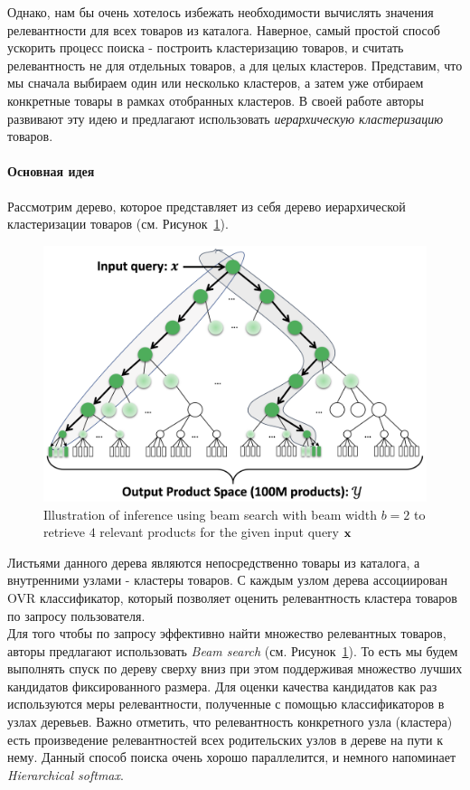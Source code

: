 Однако, нам бы очень хотелось избежать необходимости вычислять значения релевантности для всех товаров из каталога.
Наверное, самый простой способ ускорить процесс поиска - построить кластеризацию товаров, и считать релевантность не для отдельных товаров, а для целых кластеров.
Представим, что мы сначала выбираем один или несколько кластеров, а затем уже отбираем конкретные товары в рамках отобранных кластеров.
В своей работе авторы развивают эту идею и предлагают использовать \textit{иерархическую кластеризацию} товаров.

\paragraph{Основная идея} Рассмотрим дерево, которое представляет из себя дерево иерархической кластеризации товаров (см. Рисунок~\ref{fig:amazon_tree}).

\begin{figure}
    \includegraphics[width=1.0\linewidth]{images/amazon_tree.png}
    \caption{\footnotesize{Illustration of inference using beam search with beam width $b = 2$ to retrieve $4$ relevant products for the given input query ${\bf x}$}}
    \label{fig:amazon_tree}
\end{figure}

Листьями данного дерева являются непосредственно товары из каталога, а внутренними узлами - кластеры товаров.
С каждым узлом дерева ассоциирован OVR классификатор, который позволяет оценить релевантность кластера товаров по запросу пользователя. \\

Для того чтобы по запросу эффективно найти множество релевантных товаров, авторы предлагают использовать \textit{Beam search} (см. Рисунок~\ref{fig:amazon_tree}). 
То есть мы будем выполнять спуск по дереву сверху вниз при этом поддерживая множество лучших кандидатов фиксированного размера. 
Для оценки качества кандидатов как раз используются меры релевантности, полученные с помощью классификаторов в узлах деревьев.
Важно отметить, что релевантность конкретного узла (кластера) есть произведение релевантностей всех родительских узлов в дереве на пути к нему. 
Данный способ поиска очень хорошо параллелится, и немного напоминает \textit{Hierarchical softmax}. \\

